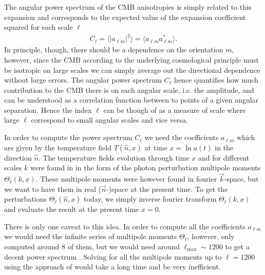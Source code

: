 \documentclass[twocolumn]{aastex62}
\begin{document}
The angular power spectrum of the CMB anisotropies is simply related to this expansion and corresponds to the expected value of the expansion coefficient squared for each scale $\ell$
\begin{align}
    C_\ell = \langle |a_{\ell m}|^2 \rangle = \langle a_{\ell m}a_{\ell m}^* \rangle.
\end{align}
In principle, though, there should be a dependence on the orientation $m$, however, since the CMB according to the underlying cosmological principle must be isotropic on large scales we can simply average out the directional dependence without large errors. The angular power spectrum $C_\ell$ hence quantifies how much contribution to the CMB there is on each angular scale, i.e. the amplitude, and can be understood as a correlation function between to points of a given angular separation. Hence the index $\ell$ can be though of as a measure of scale where large $\ell$ correspond to small angular scales and vice versa. 

In order to compute the power spectrum $C_\ell$ we need the coefficients $a_{\ell m}$ which are given by the temperature field $T(\hat{n}, x)$ at time $x = \ln a(t)$ in the direction $\hat{n}$. The temperature fields evolution through time $x$ and for different scales $k$ were found in \cite{stutzer:2020c} in the form of the photon perturbation multipole moments $\Theta_\ell(k, x)$. These multipole moments were however found in fourier $\vec{k}$-space, but we want to have them in real ($\vec{n}$-)space at the present time. To get the perturbations $\Theta_\ell(\hat{n}, x)$ today, we simply inverse fourier transform $\Theta_\ell(k, x)$ and evaluate the result at the present time $x = 0$. 

There is only one caveat to this idea. In order to compute all the coefficients $a_{\ell m}$ we would need the infinite series of multipole moments $\Theta_\ell$, however, \cite{stutzer:2020c} only computed around 8 of them, but we would need around $\ell_\text{max} \sim 1200$ to get a decent power spectrum \citep[]{winther:2020c}. Solving for all the multipole moments up to $\ell = 1200$ using the approach of \cite{stutzer:2020c} would take a long time and be very inefficient. 
\end{document}

